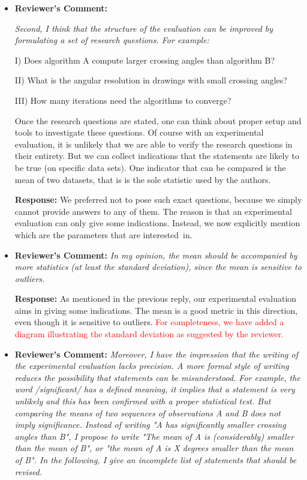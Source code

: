 \documentclass{article}
\newcommand{\rcomment}[1]{\vspace{0.3cm} \item \textbf{Reviewer's Comment:} {\em #1}}
\newcommand{\response}{\vspace{0.2cm} \textbf{Response: }}
\begin{document}
\begin{itemize}
\response{References [1-6] have been added as related work.}

\rcomment{Second, I think that the structure of the evaluation can be improved by formulating a set of research questions. For example:

I) Does algorithm A compute larger crossing angles than algorithm B?

II) What is the angular resolution in drawings with small crossing angles?

III) How many iterations need the algorithms to converge?

Once the research questions are stated, one can think about proper setup and tools to investigate these questions. Of course with an experimental evaluation, it is unlikely that we are able to verify the research questions in their entirety. But we can collect indications that the statements are likely to be true (on specific data sets). One indicator that can be compared is the mean of two datasets, that is is the sole statistic used by the authors.}

\response{We preferred not to pose such exact questions, because we simply cannot provide answers to any of them. The reason is that an experimental evaluation can only give some indications. Instead, we now explicitly mention which are the parameters that are interested~in.}

\rcomment{In my opinion, the mean should be accompanied by more statistics (at least the standard deviation), since the mean is sensitive to outliers.}

\response{As mentioned in the previous reply, our experimental evaluation aims in giving some indications. The mean is a good metric in this direction, even though it is sensitive to outliers. \textcolor{red}{For completeness, we have added a diagram illustrating the standard deviation as suggested by the reviewer.}}

\rcomment{Moreover, I have the impression that the writing of the experimental evaluation lacks precision. A more formal style of writing reduces the possibility that statements can be misunderstood. For example, the word /significant/ has a defined meaning, it implies that a statement is very unlikely and this has been confirmed with a proper statistical test. But comparing the means of two sequences of observations A and B does not imply significance. Instead of writing "A has significantly smaller crossing angles than B", I propose to write "The mean of A is (considerably) smaller than the mean of B", or "the mean of A is X degrees smaller than the mean of B". In the following, I give an incomplete list of statements that should be revised.}


\end{itemize}
\end{document}
